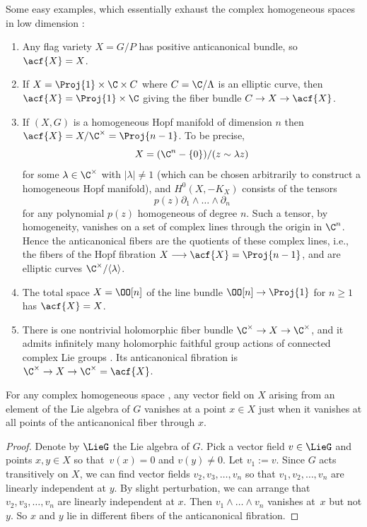 \begin{Example}
Some easy examples, which essentially exhaust the complex homogeneous spaces in low dimension \cite{McKay:2015}:
\begin{enumerate}\itemsep=0pt
\item[(1)]
Any flag variety $X = G/P$ has positive anticanonical bundle, so $\acf{X} = X$.
\item[(2)]
If $X = \Proj{1} \times \C \times C$ where $C = \C/\Lambda$ is an elliptic curve, then $\acf{X}
 = \Proj{1} \times \C$ giving the fiber bundle $C \to X \to \acf{X}$.
\item[(3)]
If $(X, G)$ is a homogeneous Hopf manifold of dimension $n$ then $\acf{X} = X/\C^{\times} = \Proj{n-1}$.
To be precise,
\[X = (\C^{n}-\{0\})/(z\sim\lambda z)\]
 for some $\lambda \in \C^{\times}$ with $|\lambda| \ne 1$ (which
can be chosen arbitrarily to construct a homogeneous Hopf manifold), and $H^0(X, -K_X)$ consists of the tensors
\[
p(z)\partial_1\wedge\dots\wedge\partial_n
\]
for any polynomial $p(z)$ homogeneous of degree $n$.
Such a tensor, by homogeneity, vanishes on a set of complex lines through the origin in $\C^{n}$.
Hence the anticanonical fibers are the quotients of these complex lines, i.e., the fibers of the Hopf fibration $X \longrightarrow \acf{X}
 = \Proj{n-1}$, and are elliptic curves $\C^{\times}/\langle \lambda\rangle$.
\item[(4)]
The total space $X = \OO[n]$ of the line bundle $\OO[n] \to \Proj{1}$ for $n \ge 1$ has $\acf{X} = X$.
\item[(5)]
There is one nontrivial holomorphic fiber bundle $\C^{\times} \to X \to \C^{\times}$, and it admits infinitely many holomorphic faithful group actions of connected complex Lie groups \cite{McKay:2015}.
Its anticanonical fibration is $\C^{\times} \to X \to \C^{\times} = \acf{X}$.
\end{enumerate}
\end{Example}

\begin{Lemma}\label{lemma:all.points}
For any complex homogeneous space , any vector field on $X$ arising from an element of the Lie algebra of $G$ vanishes
at a point $x \in X$ just when it vanishes at all points of the anticanonical fiber through $x$.
\end{Lemma}

\begin{proof}
Denote by $\LieG$ the Lie algebra of $G$.
Pick a vector field $v \in \LieG$ and points $x, y \in X$ so that~${v(x) = 0}$ and $v(y) \ne 0$.
Let $v_1 := v$.
Since $G$ acts transitively on $X$, we can find vector fields $v_2, v_3, \dots, v_n$ so that $v_1, v_2,
 \dots, v_n$ are linearly independent at $y$.
By slight perturbation, we can arrange that $v_2, v_3, \dots, v_n$ are linearly independent at $x$.
Then $v_1 \wedge \dots \wedge v_n$ vanishes at~$x$ but not $y$.
So $x$ and $y$ lie in different fibers of the anticanonical fibration.
\end{proof}


